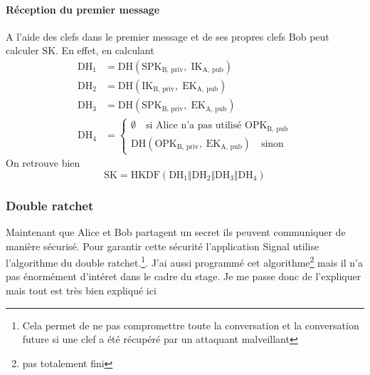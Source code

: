 \documentclass[a4paper, 12pt]{article}
\begin{document}
\paragraph{Réception du premier message}
A l'aide des clefs dans le premier message et de ses propres clefs Bob peut calculer SK. En effet, en calculant 
\begin{align*}
	\text{DH}_1 &= \hyperref[DH]{\text{DH}}\left(\text{SPK}_{\text{B, priv}}, \;\text{IK}_{\text{A, pub}}\right)\\
	\text{DH}_2 &= \hyperref[DH]{\text{DH}}\left(\text{IK}_{\text{B, priv}}, \;\text{EK}_{\text{A, pub}}\right)\\
	\text{DH}_3 &= \hyperref[DH]{\text{DH}}\left(\text{SPK}_{\text{B, priv}}, \;\text{EK}_{\text{A, pub}}\right)\\
	\text{DH}_4 &= \begin{cases}\emptyset \quad\text{si Alice n'a pas utilisé $\text{OPK}_{\text{B, pub}}$}\\\hyperref[DH]{\text{DH}}\left(\text{OPK}_{\text{B, priv}}, \;\text{EK}_{\text{A, pub}}\right) \quad\text{sinon}\end{cases}
\end{align*}
On retrouve bien 
$$\text{SK} = \hyperref[HKDF]{\text{HKDF}}\left(\text{DH}_1\hyperref[concat]{\Vert}\text{DH}_2\hyperref[concat]{\Vert}\text{DH}_3\hyperref[concat]{\Vert}\text{DH}_4\right)$$


\subsubsection{Double ratchet}\label{doubleratchet}
Maintenant que Alice et Bob partagent un secret ils peuvent communiquer de manière sécurisé. Pour garantir cette sécurité l'application Signal utilise l'algorithme du double ratchet.\footnote{Cela permet de ne pas compromettre toute la conversation et la conversation future si une clef a été récupéré par un attaquant malveillant}. J'ai aussi programmé cet algorithme\footnote{pas totalement fini} mais il n'a pas énormément d'intéret dans le cadre du stage. Je me passe donc de l'expliquer mais tout est très bien expliqué ici \cite{doubleratchet}
\end{document}
